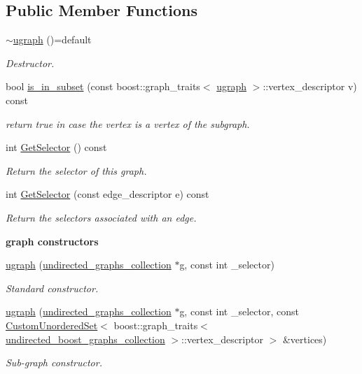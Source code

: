 \subsection*{Public Member Functions}
\begin{DoxyCompactItemize}
\item 
\hyperlink{structugraph_a453b3feab47d8bde72b393479574cd83}{$\sim$ugraph} ()=default
\begin{DoxyCompactList}\small\item\em Destructor. \end{DoxyCompactList}\item 
bool \hyperlink{structugraph_ad58ba6b5fd99f0c051ad1024722ac9bf}{is\+\_\+in\+\_\+subset} (const boost\+::graph\+\_\+traits$<$ \hyperlink{structugraph}{ugraph} $>$\+::vertex\+\_\+descriptor v) const
\begin{DoxyCompactList}\small\item\em return true in case the vertex is a vertex of the subgraph. \end{DoxyCompactList}\item 
int \hyperlink{structugraph_a6656bc7dea9e67bbae884623e89beab9}{Get\+Selector} () const
\begin{DoxyCompactList}\small\item\em Return the selector of this graph. \end{DoxyCompactList}\item 
int \hyperlink{structugraph_ae606e9e0d909d9658c45f103cbf33d91}{Get\+Selector} (const edge\+\_\+descriptor e) const
\begin{DoxyCompactList}\small\item\em Return the selectors associated with an edge. \end{DoxyCompactList}\end{DoxyCompactItemize}
\begin{Indent}\textbf{ graph constructors}\par
\begin{DoxyCompactItemize}
\item 
\hyperlink{structugraph_ab12a1f8a2e62cde4546ba4ad9e784dcf}{ugraph} (\hyperlink{structundirected__graphs__collection}{undirected\+\_\+graphs\+\_\+collection} $\ast$g, const int \+\_\+selector)
\begin{DoxyCompactList}\small\item\em Standard constructor. \end{DoxyCompactList}\item 
\hyperlink{structugraph_a9a9f0cf29d958e16981411a2a4daa2cf}{ugraph} (\hyperlink{structundirected__graphs__collection}{undirected\+\_\+graphs\+\_\+collection} $\ast$g, const int \+\_\+selector, const \hyperlink{classCustomUnorderedSet}{Custom\+Unordered\+Set}$<$ boost\+::graph\+\_\+traits$<$ \hyperlink{graph_8hpp_ab216188797d8e0a41236453b1a520b16}{undirected\+\_\+boost\+\_\+graphs\+\_\+collection} $>$\+::vertex\+\_\+descriptor $>$ \&vertices)
\begin{DoxyCompactList}\small\item\em Sub-\/graph constructor. \end{DoxyCompactList}\end{DoxyCompactItemize}
\end{Indent}

